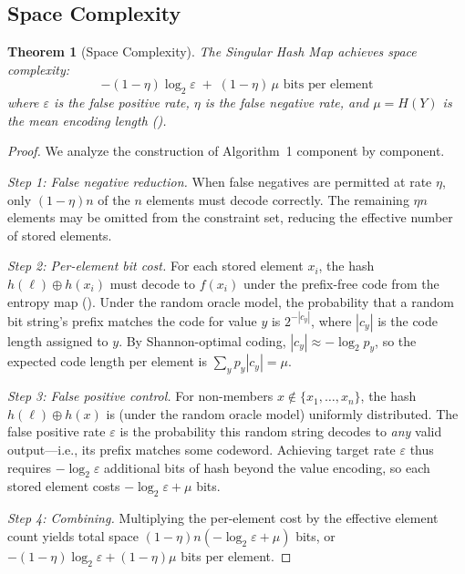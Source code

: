 \documentclass[11pt]{article}
\theoremstyle{definition}
\theoremstyle{plain}
\newtheorem{theorem}{Theorem}[section]
\theoremstyle{remark}
\begin{document}
\subsection{Space Complexity}

\begin{theorem}[Space Complexity]
\label{thm:optimal-space}
The Singular Hash Map achieves space complexity:
$$-(1-\eta)\log_2 \varepsilon \;+\; (1-\eta)\,\mu \text{ bits per element}$$
where $\varepsilon$ is the false positive rate, $\eta$ is the false negative rate, and $\mu = H(Y)$ is the mean encoding length ().
\end{theorem}

\begin{proof}
We analyze the construction of Algorithm~1 component by component.

\emph{Step 1: False negative reduction.}
When false negatives are permitted at rate $\eta$, only $(1-\eta)n$ of the $n$ elements must decode correctly.
The remaining $\eta n$ elements may be omitted from the constraint set, reducing the effective number of stored elements.

\emph{Step 2: Per-element bit cost.}
For each stored element $x_i$, the hash $h(\ell) \oplus h(x_i)$ must decode to $f(x_i)$ under the prefix-free code from the entropy map ().
Under the random oracle model, the probability that a random bit string's prefix matches the code for value $y$ is $2^{-|c_y|}$, where $|c_y|$ is the code length assigned to $y$.
By Shannon-optimal coding, $|c_y| \approx -\log_2 p_y$, so the expected code length per element is $\sum_y p_y |c_y| = \mu$.

\emph{Step 3: False positive control.}
For non-members $x \notin \{x_1, \ldots, x_n\}$, the hash $h(\ell) \oplus h(x)$ is (under the random oracle model) uniformly distributed.
The false positive rate $\varepsilon$ is the probability this random string decodes to \emph{any} valid output---i.e., its prefix matches some codeword.
Achieving target rate $\varepsilon$ thus requires $-\log_2 \varepsilon$ additional bits of hash beyond the value encoding, so each stored element costs $-\log_2 \varepsilon + \mu$ bits.

\emph{Step 4: Combining.}
Multiplying the per-element cost by the effective element count yields total space $(1-\eta)n(-\log_2 \varepsilon + \mu)$ bits, or $-(1-\eta)\log_2 \varepsilon + (1-\eta)\mu$ bits per element.
\end{proof}
\end{document}
